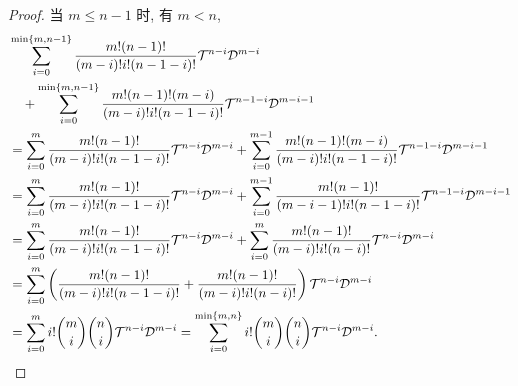 \documentclass[color=black,device=normal,lang=cn,mode=geye]{elegantnote}
\begin{document}
\begin{proof}
    当 $m\leq n-1$ 时, 有 $m<n$,
    \begin{align*}
        & \sum\limits_{i=0}^{\min\{m,n-1\}}\dfrac{m!(n-1)!}{(m-i)!i!(n-1-i)!}\mathcal{T}^{n-i}\mathcal{D}^{m-i} \\
        & \quad+\sum\limits_{i=0}^{\min\{m,n-1\}}\dfrac{m!(n-1)!(m-i)}{(m-i)!i!(n-1-i)!}\mathcal{T}^{n-1-i}\mathcal{D}^{m-i-1} \\
        & =\sum\limits_{i=0}^m\dfrac{m!(n-1)!}{(m-i)!i!(n-1-i)!}\mathcal{T}^{n-i}\mathcal{D}^{m-i}+\sum\limits_{i=0}^{m-1}\dfrac{m!(n-1)!(m-i)}{(m-i)!i!(n-1-i)!}\mathcal{T}^{n-1-i}\mathcal{D}^{m-i-1} \\
        & =\sum\limits_{i=0}^m\dfrac{m!(n-1)!}{(m-i)!i!(n-1-i)!}\mathcal{T}^{n-i}\mathcal{D}^{m-i}+\sum\limits_{i=0}^{m-1}\dfrac{m!(n-1)!}{(m-i-1)!i!(n-1-i)!}\mathcal{T}^{n-1-i}\mathcal{D}^{m-i-1} \\
        & =\sum\limits_{i=0}^m\dfrac{m!(n-1)!}{(m-i)!i!(n-1-i)!}\mathcal{T}^{n-i}\mathcal{D}^{m-i}+\sum\limits_{i=0}^{m}\dfrac{m!(n-1)!}{(m-i)!i!(n-i)!}\mathcal{T}^{n-i}\mathcal{D}^{m-i} \\
        & =\sum\limits_{i=0}^m\left(\dfrac{m!(n-1)!}{(m-i)!i!(n-1-i)!}+\dfrac{m!(n-1)!}{(m-i)!i!(n-i)!}\right)\mathcal{T}^{n-i}\mathcal{D}^{m-i} \\
        & =\sum\limits_{i=0}^mi!\dbinom{m}{i}\dbinom{n}{i}\mathcal{T}^{n-i}\mathcal{D}^{m-i}=\sum\limits_{i=0}^{\min\{m,n\}}i!\dbinom{m}{i}\dbinom{n}{i}\mathcal{T}^{n-i}\mathcal{D}^{m-i}.\qedhere
    \end{align*}
\end{proof}
\end{document}
